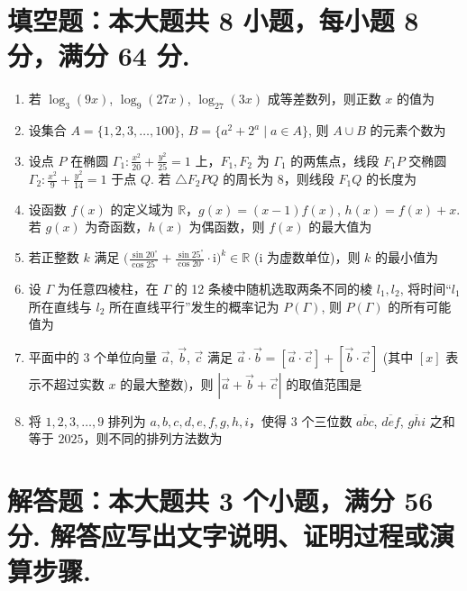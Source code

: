 \documentclass{chsmc}
\begin{document}
\section{填空题：本大题共 8 小题，每小题 8 分，满分 64 分.}

\begin{enumerate}
  \item 若 $\log_3 (9x)$, $\log_9 (27x)$, $\log_{27} (3x)$
    成等差数列，则正数 $x$ 的值为 \blankline
  \item 设集合 $A = \{1,2,3,\ldots,100\}$, $B = \{a^2+2^a \mid a\in A\}$,
    则 $A\cup B$ 的元素个数为 \blankline
  \item 设点 $P$ 在椭圆 $\Gamma_1: \frac{x^2}{20} + \frac{y^2}{25} = 1$
    上，$F_1,F_2$ 为 $\Gamma_1$ 的两焦点，线段 $F_1P$ 交椭圆
    $\Gamma_2: \frac{x^2}{9} + \frac{y^2}{14} = 1$ 于点 $Q$.
    若 $\triangle F_2PQ$ 的周长为 8，则线段 $F_1Q$ 的长度为 \blankline
  \item 设函数 $f(x)$ 的定义域为 $\mathbb{R}$，$g(x) = (x-1)f(x)$,
    $h(x) = f(x)+x$. 若 $g(x)$ 为奇函数，$h(x)$ 为偶函数，则 $f(x)$ 的最大值为 \blankline
  \item 若正整数 $k$ 满足 $\displaystyle \biggl(
    \frac{\sin 20^\circ}{\cos 25^\circ} 
    + \frac{\sin 25^\circ}{\cos 20^\circ}\cdot\mathrm{i}
    \biggr)^k \in \mathbb{R}$ ($\mathrm{i}$ 为虚数单位)，则 $k$ 的最小值为 \blankline
  \item 设 $\Gamma$ 为任意四棱柱，在 $\Gamma$ 的 12 条棱中随机选取两条不同的棱
    $l_1,l_2$, 将时间“$l_1$ 所在直线与 $l_2$ 所在直线平行”发生的概率记为 $P(\Gamma)$,
    则 $P(\Gamma)$ 的所有可能值为 \blankline
  \item 平面中的 3 个单位向量 $\vec{a}$, $\vec{b}$, $\vec{c}$
    满足 $\vec{a}\cdot\vec{b} = [\vec{a}\cdot\vec{c}] + [\vec{b}\cdot\vec{c}]$
    (其中 $[x]$ 表示不超过实数 $x$ 的最大整数)，则 $|\vec{a}+\vec{b}+\vec{c}|$
    的取值范围是 \blankline
  \item 将 $1,2,3,\ldots,9$ 排列为 $a,b,c,d,e,f,g,h,i$，使得
    3 个三位数 $\overline{abc}$, $\overline{def}$, $\overline{ghi}$
    之和等于 $2025$，则不同的排列方法数为 \blankline
\end{enumerate}

\section{解答题：本大题共 3 个小题，满分 56 分. 解答应写出文字说明、证明过程或演算步骤.}
\end{document}
